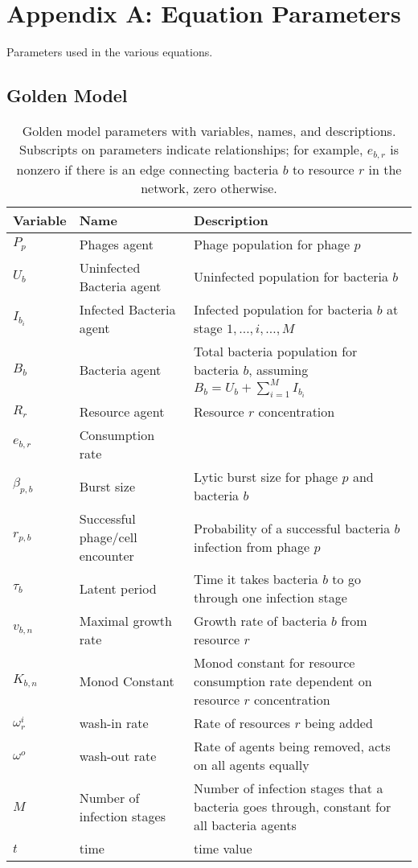 \chapter{Appendix A: Equation Parameters}
\label{AppendixA}
Parameters used in the various equations. 

\section{Golden Model}
\begin{table}[htbp]
    \small %
    \centering
    \begin{tabularx}{\textwidth}{l l X}
        \toprule
        \textbf{Variable} & \textbf{Name} & \textbf{Description} \\
        \midrule
        $P_p$ & Phages agent & Phage population for phage $p$ \\
        $U_b$ & Uninfected Bacteria agent & Uninfected population for bacteria $b$ \\
        $I_{b_i}$ & Infected Bacteria agent & Infected population for bacteria $b$ at stage $1, \dots, i, \dots, M$  \\
        $B_b$ & Bacteria agent & Total bacteria population for bacteria $b$, assuming $B_b = U_b + \sum_{i=1}^M I_{b_i}$ \\
        $R_r$ & Resource agent & Resource $r$ concentration\\
        $e_{b, r}$ & Consumption rate& \\
        $\beta_{p, b}$ & Burst size & Lytic burst size for phage $p$ and bacteria $b$\\
        $r_{p, b}$ & Successful phage/cell encounter & Probability of a successful bacteria $b$ infection from phage $p$\\
        $\tau_{b}$ & Latent period & Time it takes bacteria $b$ to go through one infection stage\\
        $v_{b, n}$ & Maximal growth rate & Growth rate of bacteria $b$ from resource $r$ \\
        $K_{b, n}$ & Monod Constant & Monod constant for resource consumption rate dependent on resource $r$ concentration\\
        $\omega^i_r$ & wash-in rate & Rate of resources $r$ being added\\
        $\omega^o$ & wash-out rate & Rate of agents being removed, acts on all agents equally\\
        $M$ & Number of infection stages & Number of infection stages that a bacteria goes through, constant for all bacteria agents\\
        $t$ & time & time value \\
        \bottomrule
    \end{tabularx}\newline
    \caption{Golden model parameters with variables, names, and descriptions. Subscripts on parameters indicate relationships; for example, $e_{b, r}$ is nonzero if there is an edge connecting bacteria $b$ to resource $r$ in the network, zero otherwise.}
    \label{tab:parameter_table_golden_model}
\end{table}


